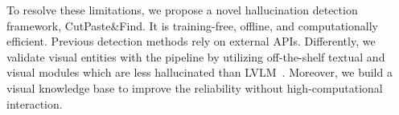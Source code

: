 





To resolve these limitations, we propose a novel hallucination detection framework, CutPaste\&Find. 
It is training-free, offline, and computationally efficient.
Previous detection methods rely on external APIs. 
Differently, we validate visual entities with the pipeline by utilizing off-the-shelf textual and visual modules which are less hallucinated than LVLM~\cite{Yin_2024}.
Moreover, we build a visual knowledge base to improve the reliability without high-computational interaction.

